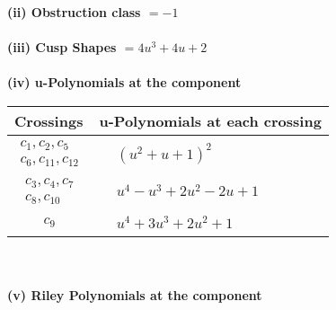 \documentclass[1p]{elsarticle_modified}
\theoremstyle{definition}
\begin{document}
\flushleft \textbf{(ii) Obstruction class $= -1$}\\~\\
\flushleft \textbf{(iii) Cusp Shapes $= 4 u^3+4 u+2$}\\~\\
\newpage\renewcommand{\arraystretch}{1}
\flushleft \textbf{(iv) u-Polynomials at the component}\newline \\
\begin{tabular}{m{50pt}|m{274pt}}
Crossings & \hspace{64pt}u-Polynomials at each crossing \\
\hline $$\begin{aligned}c_{1},c_{2},c_{5}\\c_{6},c_{11},c_{12}\end{aligned}$$&$\begin{aligned}
&(u^2+u+1)^2
\end{aligned}$\\
\hline $$\begin{aligned}c_{3},c_{4},c_{7}\\c_{8},c_{10}\end{aligned}$$&$\begin{aligned}
&u^4- u^3+2 u^2-2 u+1
\end{aligned}$\\
\hline $$\begin{aligned}c_{9}\end{aligned}$$&$\begin{aligned}
&u^4+3 u^3+2 u^2+1
\end{aligned}$\\
\hline
\end{tabular}\\~\\
\newpage\renewcommand{\arraystretch}{1}
\flushleft \textbf{(v) Riley Polynomials at the component}\newline \\
\end{document}
